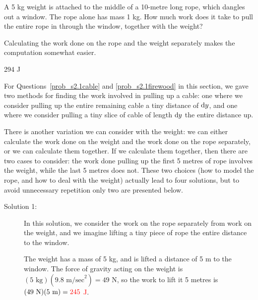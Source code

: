 \begin{question}\label{prob_s2.1:normal2}
A 5 kg weight is attached to the middle of a 10-metre long rope, which dangles out a window. The rope alone has mass 1 kg. How much work does it take to pull the entire rope in through the window, together with the weight?
\end{question}
\begin{hint}
Calculating the work done on the rope and the weight separately makes the computation somewhat easier.
\end{hint}
\begin{answer}
294 J
\end{answer}
\begin{solution}
For Questions~\ref{prob_s2.1cable} and \ref{prob_s2.1firewood} in this section, we gave two methods for finding the work involved in pulling up a cable: one where we consider pulling up the entire remaining cable a tiny distance of $\mathrm{d}y$, and one where we consider pulling a tiny slice of cable of length $\mathrm{d}y$ the entire distance up.

There is another variation we can consider with the weight: we can either calculate the work done on the weight and the work done on the rope separately, or we can calculate them together. If we calculate them together, then there are two cases to consider: the work done pulling up the first 5 metres of rope involves the weight, while the last 5 metres does not. These two choices (how to model the rope, and how to deal with the weight) actually lead to four solutions, but to avoid unnecessary repetition only two are presented below.
\begin{description}
\item[Solution 1:] In this solution, we consider the work on the rope separately from work on the weight, and we imagine lifting a tiny piece of rope the entire distance to the window.

The weight has a mass of 5 kg, and is lifted a distance of 5 m to the window. The force of gravity acting on the weight is $(5 \text{ kg})(9.8 \text{ m/sec}^2) = 49$ N, so the work to lift it 5 metres is $(49\text{ N})(5\text{ m}) = \textcolor{red}{245}$ \textcolor{red}J.

\begin{center}
\end{center}


\end{description}
\end{solution}
